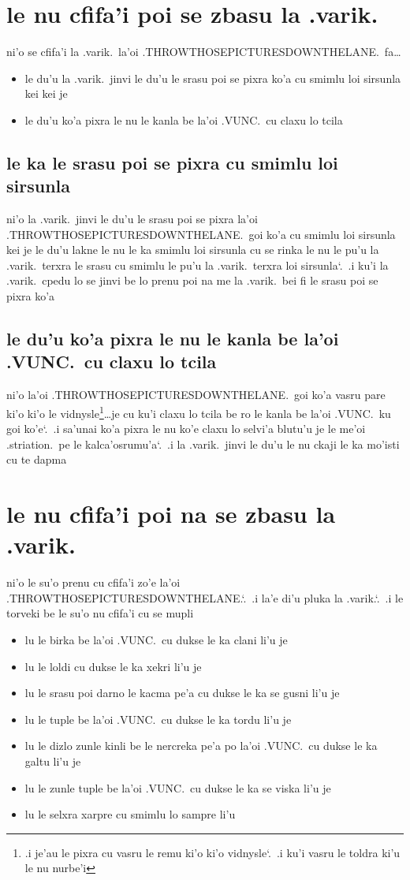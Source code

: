 \documentclass{report}
\newcommand\sds{\spacefactor\sfcode`.\ \space}
\begin{document}
\section{le nu cfifa'i poi se zbasu la .varik.}
ni'o se cfifa'i la .varik.\ la'oi .THROWTHOSEPICTURESDOWNTHELANE.\ fa\ldots
\begin{itemize}
	\item le du'u la .varik.\ jinvi le du'u le srasu poi se pixra ko'a cu smimlu loi sirsunla kei kei je
	\item le du'u ko'a pixra le nu le kanla be la'oi .VUNC.\ cu claxu lo tcila
\end{itemize}

\subsection{le ka le srasu poi se pixra cu smimlu loi sirsunla}
ni'o la .varik.\ jinvi le du'u le srasu poi se pixra la'oi .THROWTHOSEPICTURESDOWNTHELANE.\ goi ko'a cu smimlu loi sirsunla kei je le du'u lakne le nu le ka smimlu loi sirsunla cu se rinka le nu le pu'u la .varik.\ terxra le srasu cu smimlu le pu'u la .varik.\ terxra loi sirsunla\sds  .i ku'i la .varik.\ cpedu lo se jinvi be lo prenu poi na me la .varik.\ bei fi le srasu poi se pixra ko'a

\subsection{le du'u ko'a pixra le nu le kanla be la'oi .VUNC.\ cu claxu lo tcila}
ni'o la'oi .THROWTHOSEPICTURESDOWNTHELANE.\ goi ko'a vasru pare ki'o ki'o le vidnysle\footnote{.i je'au le pixra cu vasru le remu ki'o ki'o vidnysle\sds  .i ku'i vasru le toldra ki'u le nu nurbe'i}\ldots je cu ku'i claxu lo tcila be ro le kanla be la'oi .VUNC.\ ku goi ko'e\sds  .i sa'unai ko'a pixra le nu ko'e claxu lo selvi'a blutu'u je le me'oi .striation.\ pe le kalca'osrumu'a\sds  .i la .varik.\ jinvi le du'u le nu ckaji le ka mo'isti cu te dapma

\section{le nu cfifa'i poi na se zbasu la .varik.}
ni'o le su'o prenu cu cfifa'i zo'e la'oi .THROWTHOSEPICTURESDOWNTHELANE.\sds  .i la'e di'u pluka la .varik.\sds  .i le torveki be le su'o nu cfifa'i cu se mupli
\begin{itemize}
	\item lu le birka be la'oi .VUNC.\ cu dukse le ka clani li'u je
	\item lu le loldi cu dukse le ka xekri li'u je
	\item lu le srasu poi darno le kacma pe'a cu dukse le ka se gusni li'u je
	\item lu le tuple be la'oi .VUNC.\ cu dukse le ka tordu li'u je
	\item lu le dizlo zunle kinli be le nercreka pe'a po la'oi .VUNC.\ cu dukse le ka galtu li'u je
	\item lu le zunle tuple be la'oi .VUNC.\ cu dukse le ka se viska li'u je
	\item lu le selxra xarpre cu smimlu lo sampre li'u
\end{itemize}
\end{document}
